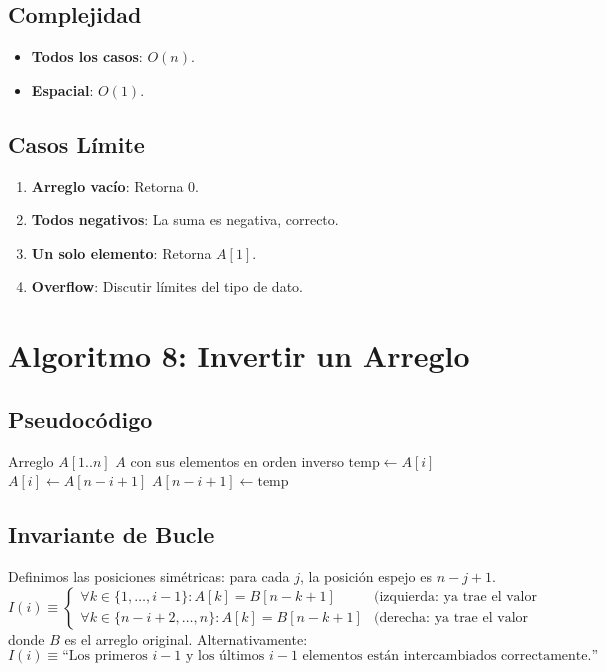 \documentclass[11pt,a4paper]{article}
\newcommand{\inv}{I}
\begin{document}
\subsection{Complejidad}
\begin{itemize}
    \item \textbf{Todos los casos}: $O(n)$.
    \item \textbf{Espacial}: $O(1)$.
\end{itemize}

\subsection{Casos Límite}
\begin{enumerate}
    \item \textbf{Arreglo vacío}: Retorna $0$.
    \item \textbf{Todos negativos}: La suma es negativa, correcto.
    \item \textbf{Un solo elemento}: Retorna $A[1]$.
    \item \textbf{Overflow}: Discutir límites del tipo de dato.
\end{enumerate}

\newpage

\section{Algoritmo 8: Invertir un Arreglo}

\subsection{Pseudocódigo}
\begin{algorithm}[H]
\caption{Invertir Arreglo in-place}
\begin{algorithmic}[1]
\Require Arreglo $A[1..n]$
\Ensure $A$ con sus elementos en orden inverso
    \State $\text{temp} \gets A[i]$
    \State $A[i] \gets A[n - i + 1]$
    \State $A[n - i + 1] \gets \text{temp}$
\EndFor
\end{algorithmic}
\end{algorithm}

\subsection{Invariante de Bucle}
Definimos las posiciones simétricas: para cada $j$, la posición espejo es $n - j + 1$.
\[
\boxed{\inv(i) \equiv \begin{cases}
\forall k \in \{1, \ldots, i-1\}: A[k] = B[n-k+1] & \text{(izquierda: ya trae el valor original de la derecha)}\\
\forall k \in \{n-i+2, \ldots, n\}: A[k] = B[n-k+1] & \text{(derecha: ya trae el valor original de la izquierda)}
\end{cases}}
\]
 donde $B$ es el arreglo original. Alternativamente:
\[
\inv(i) \equiv \text{``Los primeros } i-1 \text{ y los últimos } i-1 \text{ elementos están intercambiados correctamente.''}
\]
\end{document}
